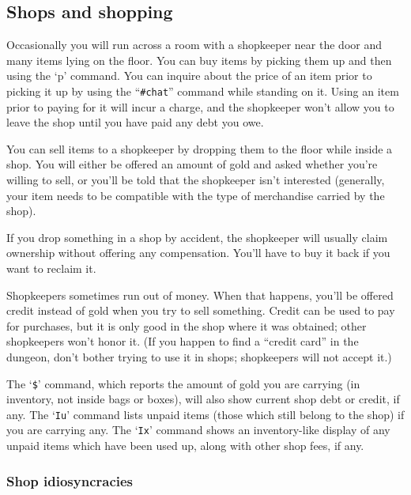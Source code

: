 \subsection*{Shops and shopping}

Occasionally you will run across a room with a shopkeeper near the door
and many items lying on the floor.  You can buy items by picking them
up and then using the `p' command.  You can inquire about the price
of an item prior to picking it up by using the ``{\tt \#chat}'' command
while standing on it.  Using an item prior to paying for it will incur a
charge, and the shopkeeper won't allow you to leave the shop until you
have paid any debt you owe.

You can sell items to a shopkeeper by dropping them to the floor while
inside a shop.  You will either be offered an amount of gold and asked
whether you're willing to sell, or you'll be told that the shopkeeper
isn't interested (generally, your item needs to be compatible with the
type of merchandise carried by the shop).

If you drop something in a shop by accident, the shopkeeper will usually
claim ownership without offering any compensation.  You'll have to buy
it back if you want to reclaim it.

Shopkeepers sometimes run out of money.  When that happens, you'll be
offered credit instead of gold when you try to sell something.  Credit
can be used to pay for purchases, but it is only good in the shop where
it was obtained; other shopkeepers won't honor it.  (If you happen to
find a ``credit card'' in the dungeon, don't bother trying to use it in
shops; shopkeepers will not accept it.)

The `{\tt \$}' command, which reports the amount of gold you are carrying
(in inventory, not inside bags or boxes), will also show current shop
debt or credit, if any.  The `{\tt Iu}' command lists unpaid items
(those which still belong to the shop) if you are carrying any.
The `{\tt Ix}' command shows an inventory-like display of any unpaid
items which have been used up, along with other shop fees, if any.
\subsubsection*{Shop idiosyncracies}

